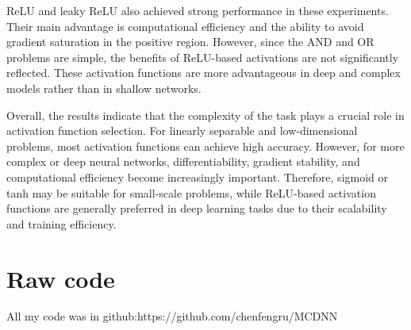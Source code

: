 \documentclass[11pt]{article}
\begin{document}
ReLU and leaky ReLU also achieved strong performance in these experiments. Their main advantage is computational efficiency and the ability to avoid gradient saturation in the positive region. However, since the AND and OR problems are simple, the benefits of ReLU-based activations are not significantly reflected. These activation functions are more advantageous in deep and complex models rather than in shallow networks.

Overall, the results indicate that the complexity of the task plays a crucial role in activation function selection. For linearly separable and low-dimensional problems, most activation functions can achieve high accuracy. However, for more complex or deep neural networks, differentiability, gradient stability, and computational efficiency become increasingly important. Therefore, sigmoid or tanh may be suitable for small-scale problems, while ReLU-based activation functions are generally preferred in deep learning tasks due to their scalability and training efficiency.

\section{Raw code}
All my code was in github:https://github.com/chenfengru/MCDNN
\end{document}
